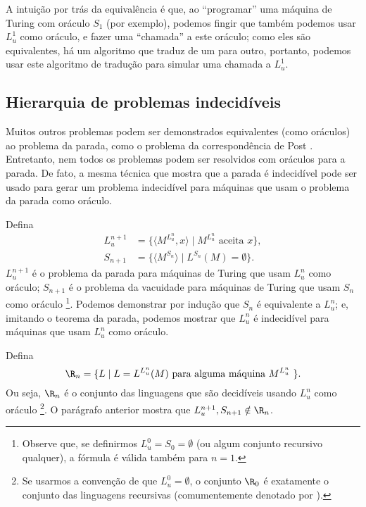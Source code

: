 A intuição por trás da equivalência é que,
ao ``programar'' uma máquina de Turing com oráculo $S_1$ (por exemplo),
podemos fingir que também podemos usar $L_u^1$ como oráculo,
e fazer uma ``chamada'' a este oráculo;
como eles são equivalentes,
há um algoritmo que traduz de um para outro,
portanto, podemos usar este algoritmo de tradução
para simular uma chamada a $L_u^1$.

\subsection{Hierarquia de problemas indecidíveis}

Muitos outros problemas podem ser demonstrados equivalentes
(como oráculos)
ao problema da parada,
como o problema da correspondência de Post \cite[p. 214]{HopcroftUllman1979}.
Entretanto,
nem todos os problemas podem ser resolvidos com oráculos para a parada.
De fato, a mesma técnica que mostra que a parada é indecidível
pode ser usado para gerar um problema indecidível
para máquinas que usam o problema da parada como oráculo.

Defina
\begin{align*}
    L_u^{n+1} &= \{ \langle M^{L_u^n}, x \rangle \mid M^{L_u^n} \text{ aceita } x \}, \\
    S_{n+1} &= \{ \langle M^{S_n} \rangle \mid L^{S_n}(M) = \emptyset \}.
\end{align*}
$L_u^{n+1}$ é o problema da parada
para máquinas de Turing que usam $L_u^n$ como oráculo;
$S_{n+1}$ é o problema da vacuidade
para máquinas de Turing que usam $S_n$ como oráculo%
\footnote{
    Observe que,
    se definirmos $L_u^0 = S_0 = \emptyset$
    (ou algum conjunto recursivo qualquer),
    a fórmula é válida também para $n = 1$.
}.
Podemos demonstrar por indução que $S_n$ é equivalente a $L_u^n$;
e, imitando o teorema da parada,
podemos mostrar que $L_u^n$ é indecidível para máquinas que usam $L_u^n$ como oráculo.

Defina
\begin{equation*}
    \R_n = \{ L \mid L = L^{L_u^n}(M) \text{ para alguma máquina $M^{L_u^n}$ } \}.
\end{equation*}
Ou seja, $\R_n$ é o conjunto das linguagens
que são decidíveis usando $L_u^n$ como oráculo%
\footnote{
    Se usarmos a convenção de que $L_u^0 = \emptyset$,
    o conjunto $\R_0$ é exatamente o conjunto das linguagens recursivas
    (comumentemente denotado por \R).
}.
O parágrafo anterior mostra que $L_u^{n+1}, S_{n+1} \notin \R_n$.

